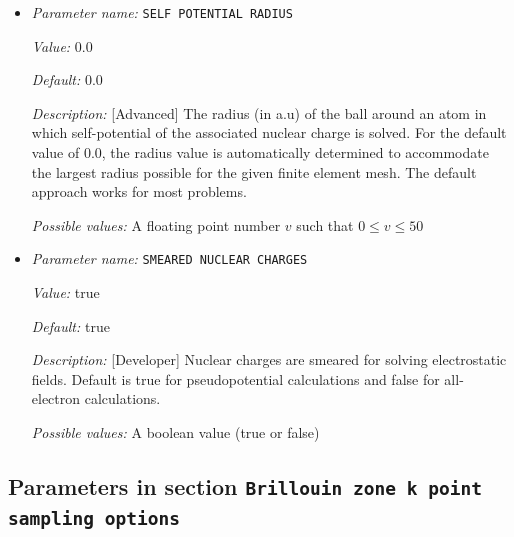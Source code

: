 \begin{itemize}
{\it Value:} false


{\it Default:} false


{\it Description:} [Developer] Flag to set point wise dirichlet constraints to eliminate null-space associated with the discretized Poisson operator subject to periodic BCs.


{\it Possible values:} A boolean value (true or false)
\item {\it Parameter name:} {\tt SELF POTENTIAL RADIUS}
\label{parameters:Boundary conditions/SELF POTENTIAL RADIUS}
\label{parameters:Boundary_20conditions/SELF_20POTENTIAL_20RADIUS}


{\it Value:} 0.0


{\it Default:} 0.0


{\it Description:} [Advanced] The radius (in a.u) of the ball around an atom in which self-potential of the associated nuclear charge is solved. For the default value of 0.0, the radius value is automatically determined to accommodate the largest radius possible for the given finite element mesh. The default approach works for most problems.


{\it Possible values:} A floating point number $v$ such that $0 \leq v \leq 50$
\item {\it Parameter name:} {\tt SMEARED NUCLEAR CHARGES}
\label{parameters:Boundary conditions/SMEARED NUCLEAR CHARGES}
\label{parameters:Boundary_20conditions/SMEARED_20NUCLEAR_20CHARGES}


{\it Value:} true


{\it Default:} true


{\it Description:} [Developer] Nuclear charges are smeared for solving electrostatic fields. Default is true for pseudopotential calculations and false for all-electron calculations.


{\it Possible values:} A boolean value (true or false)
\end{itemize}

\subsection{Parameters in section \tt Brillouin zone k point sampling options}
\label{parameters:Brillouin_20zone_20k_20point_20sampling_20options}

